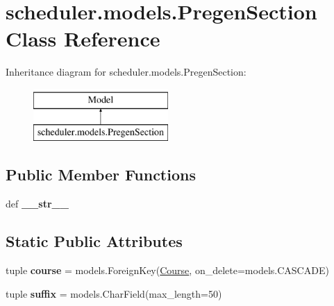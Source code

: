 \hypertarget{classscheduler_1_1models_1_1_pregen_section}{\section{scheduler.\-models.\-Pregen\-Section Class Reference}
\label{classscheduler_1_1models_1_1_pregen_section}
}
Inheritance diagram for scheduler.\-models.\-Pregen\-Section\-:\begin{figure}[H]
\begin{center}
\leavevmode
\includegraphics[height=2.000000cm]{classscheduler_1_1models_1_1_pregen_section}
\end{center}
\end{figure}
\subsection*{Public Member Functions}
\begin{DoxyCompactItemize}
\item 
\hypertarget{classscheduler_1_1models_1_1_pregen_section_a0f46c875c91c38646fdefea75fb5d652}{def {\bfseries \-\_\-\-\_\-str\-\_\-\-\_\-}}\label{classscheduler_1_1models_1_1_pregen_section_a0f46c875c91c38646fdefea75fb5d652}

\end{DoxyCompactItemize}
\subsection*{Static Public Attributes}
\begin{DoxyCompactItemize}
\item 
\hypertarget{classscheduler_1_1models_1_1_pregen_section_a3eafd0071b89cf3573c5f47c9194f848}{tuple {\bfseries course} = models.\-Foreign\-Key(\hyperlink{classscheduler_1_1models_1_1_course}{Course}, on\-\_\-delete=models.\-C\-A\-S\-C\-A\-D\-E)}\label{classscheduler_1_1models_1_1_pregen_section_a3eafd0071b89cf3573c5f47c9194f848}

\item 
\hypertarget{classscheduler_1_1models_1_1_pregen_section_ae51c6af4b08756b861dc5fe9bec2e203}{tuple {\bfseries suffix} = models.\-Char\-Field(max\-\_\-length=50)}\label{classscheduler_1_1models_1_1_pregen_section_ae51c6af4b08756b861dc5fe9bec2e203}

\end{DoxyCompactItemize}


